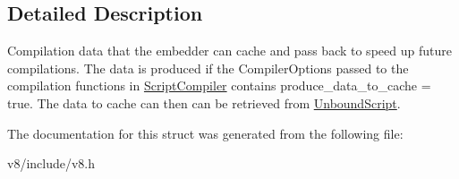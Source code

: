 \subsection{Detailed Description}
Compilation data that the embedder can cache and pass back to speed up future compilations. The data is produced if the Compiler\-Options passed to the compilation functions in \hyperlink{classv8_1_1ScriptCompiler}{Script\-Compiler} contains produce\-\_\-data\-\_\-to\-\_\-cache = true. The data to cache can then can be retrieved from \hyperlink{classv8_1_1UnboundScript}{Unbound\-Script}. 

The documentation for this struct was generated from the following file\-:\begin{DoxyCompactItemize}
\item 
v8/include/v8.\-h\end{DoxyCompactItemize}
